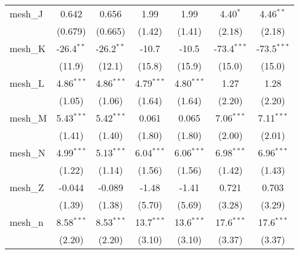 \begin{tabular}{lcccccc}
   mesh\_J                                                     & 0.642         & 0.656         & 1.99          & 1.99          & 4.40$^{*}$    & 4.46$^{**}$\\   
                                                               & (0.679)       & (0.665)       & (1.42)        & (1.41)        & (2.18)        & (2.18)\\   
   mesh\_K                                                     & -26.4$^{**}$  & -26.2$^{**}$  & -10.7         & -10.5         & -73.4$^{***}$ & -73.5$^{***}$\\   
                                                               & (11.9)        & (12.1)        & (15.8)        & (15.9)        & (15.0)        & (15.0)\\   
   mesh\_L                                                     & 4.86$^{***}$  & 4.86$^{***}$  & 4.79$^{***}$  & 4.80$^{***}$  & 1.27          & 1.28\\   
                                                               & (1.05)        & (1.06)        & (1.64)        & (1.64)        & (2.20)        & (2.20)\\   
   mesh\_M                                                     & 5.43$^{***}$  & 5.42$^{***}$  & 0.061         & 0.065         & 7.06$^{***}$  & 7.11$^{***}$\\   
                                                               & (1.41)        & (1.40)        & (1.80)        & (1.80)        & (2.00)        & (2.01)\\   
   mesh\_N                                                     & 4.99$^{***}$  & 5.13$^{***}$  & 6.04$^{***}$  & 6.06$^{***}$  & 6.98$^{***}$  & 6.96$^{***}$\\   
                                                               & (1.22)        & (1.14)        & (1.56)        & (1.56)        & (1.42)        & (1.43)\\   
   mesh\_Z                                                     & -0.044        & -0.089        & -1.48         & -1.41         & 0.721         & 0.703\\   
                                                               & (1.39)        & (1.38)        & (5.70)        & (5.69)        & (3.28)        & (3.29)\\   
   mesh\_n                                                     & 8.58$^{***}$  & 8.53$^{***}$  & 13.7$^{***}$  & 13.6$^{***}$  & 17.6$^{***}$  & 17.6$^{***}$\\   
                                                               & (2.20)        & (2.20)        & (3.10)        & (3.10)        & (3.37)        & (3.37)\\   

\end{tabular}
